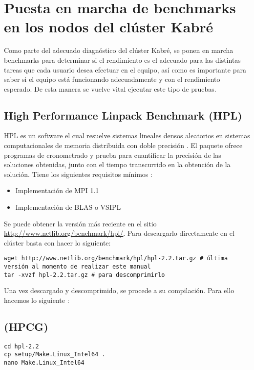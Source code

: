 \chapter{Puesta en marcha de benchmarks en los nodos del clúster Kabré}
Como parte del adecuado diagnóstico del clúster Kabré, se ponen en marcha benchmarks para determinar si el rendimiento es el adecuado para las distintas tareas que cada usuario desea efectuar en el equipo, así como es importante para saber si el equipo está funcionando adecuadamente y con el rendimiento esperado. De esta manera se vuelve vital ejecutar este tipo de pruebas. 

\section{High Performance Linpack Benchmark (HPL)}
HPL es un software el cual resuelve sistemas lineales densos aleatorios en sistemas computacionales de memoria distribuida con doble precisión \cite{linpack00}. El paquete ofrece programas de cronometrado y prueba para cuantificar la precisión de las soluciones obtenidas, junto con el tiempo transcurrido en la obtención de la solución. Tiene los siguientes requisitos mínimos \cite{linpack02}:

\begin{itemize}
\item Implementación de MPI 1.1
\item Implementación de BLAS o VSIPL
\end{itemize}

Se puede obtener la versión más reciente en el sitio \url{http://www.netlib.org/benchmark/hpl/}. Para descargarlo directamente en el clúster basta con hacer lo siguiente:

\begin{lstlisting}
wget http://www.netlib.org/benchmark/hpl/hpl-2.2.tar.gz # última versión al momento de realizar este manual
tar -xvzf hpl-2.2.tar.gz # para descomprimirlo
\end{lstlisting}

Una vez descargado y descomprimido, se procede a su compilación. Para ello hacemos lo siguiente \cite{linpack03}:

\section{(HPCG)}

\begin{lstlisting}
cd hpl-2.2
cp setup/Make.Linux_Intel64 .
nano Make.Linux_Intel64
\end{lstlisting}


